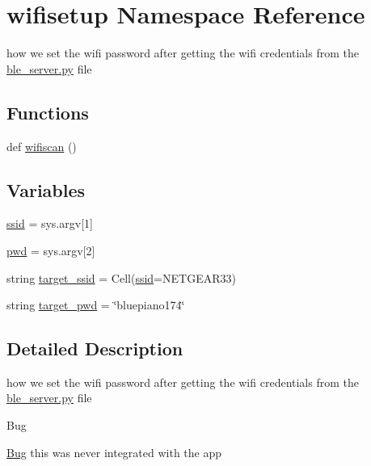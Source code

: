 \hypertarget{namespacewifisetup}{}\section{wifisetup Namespace Reference}
\label{namespacewifisetup}


how we set the wifi password after getting the wifi credentials from the \hyperlink{ble__server_8py}{ble\+\_\+server.\+py} file  


\subsection*{Functions}
\begin{DoxyCompactItemize}
\item 
def \hyperlink{namespacewifisetup_a17a551c5f64619a2084a9821846dbb6c}{wifiscan} ()
\end{DoxyCompactItemize}
\subsection*{Variables}
\begin{DoxyCompactItemize}
\item 
\hyperlink{namespacewifisetup_a4bc2f11329825548456f3142bdee0089}{ssid} = sys.\+argv\mbox{[}1\mbox{]}
\item 
\hyperlink{namespacewifisetup_a27b738b1d8aa8f9123037aacc27023be}{pwd} = sys.\+argv\mbox{[}2\mbox{]}
\item 
string \hyperlink{namespacewifisetup_ab08d35f8dc6e6fb77b0af4052fac39a0}{target\+\_\+ssid} = \textquotesingle{}Cell(\hyperlink{namespacewifisetup_a4bc2f11329825548456f3142bdee0089}{ssid}=N\+E\+T\+G\+E\+A\+R33)\textquotesingle{}
\item 
string \hyperlink{namespacewifisetup_a70e460058b6d12af47dbc64c66159618}{target\+\_\+pwd} = \char`\"{}bluepiano174\char`\"{}
\end{DoxyCompactItemize}


\subsection{Detailed Description}
how we set the wifi password after getting the wifi credentials from the \hyperlink{ble__server_8py}{ble\+\_\+server.\+py} file 

\begin{DoxyRefDesc}{Bug}
\item[\hyperlink{bug__bug000001}{Bug}]this was never integrated with the app \end{DoxyRefDesc}


